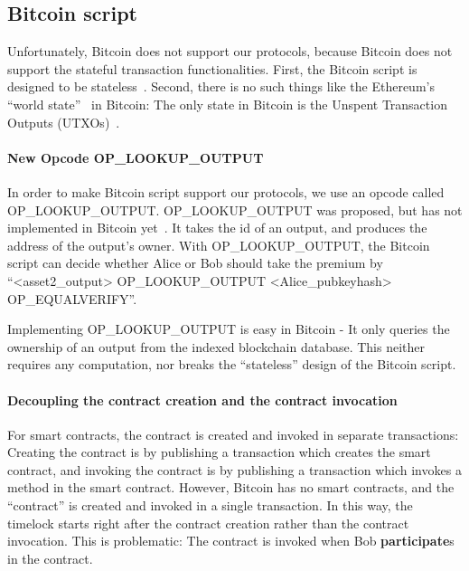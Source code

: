 \subsection{Bitcoin script}

Unfortunately, Bitcoin does not support our protocols, because Bitcoin does not support the stateful transaction functionalities.
First, the Bitcoin script is designed to be stateless~\cite{okupski2014bitcoin}.
Second, there is no such things like the Ethereum's ``world state''~\cite{wood2014ethereum} in Bitcoin:
The only state in Bitcoin is the Unspent Transaction Outputs (UTXOs)~\cite{nakamoto2008bitcoin}.


\paragraph{New Opcode OP\_LOOKUP\_OUTPUT}
In order to make Bitcoin script support our protocols, we use an opcode called OP\_LOOKUP\_OUTPUT.
OP\_LOOKUP\_OUTPUT was proposed, but has not implemented in Bitcoin yet~\cite{op-lookup-output-origin}.
It takes the id of an output, and produces the address of the output's owner.
With OP\_LOOKUP\_OUTPUT, the Bitcoin script can decide whether Alice or Bob should take the premium by
``<asset2\_output> OP\_LOOKUP\_OUTPUT <Alice\_pubkeyhash> OP\_EQUALVERIFY''.

Implementing OP\_LOOKUP\_OUTPUT is easy in Bitcoin - It only queries the ownership of an output from the indexed blockchain database.
This neither requires any computation, nor breaks the ``stateless'' design of the Bitcoin script.


\paragraph{Decoupling the contract creation and the contract invocation}
For smart contracts, the contract is created and invoked in separate transactions:
Creating the contract is by publishing a transaction which creates the smart contract,
and invoking the contract is by publishing a transaction which invokes a method in the smart contract.
However, Bitcoin has no smart contracts, and the ``contract'' is created and invoked in a single transaction.
In this way, the timelock starts right after the contract creation rather than the contract invocation.
This is problematic: The contract is invoked when Bob \textbf{participate}s in the contract.


